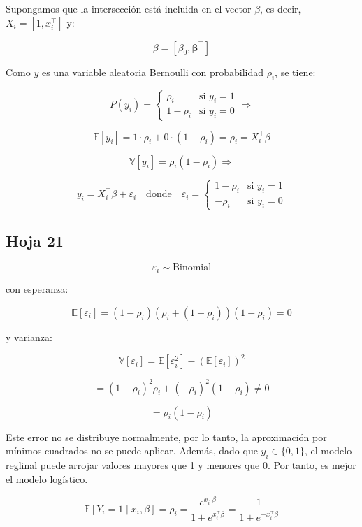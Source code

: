 \documentclass[12pt]{article}
\begin{document}
\noindent Supongamos que la intersección está incluida en el vector \( \beta \), es decir, \( X_i = [1, x_i^\top] \) y:

\[
\beta = [\beta_0, \boldsymbol{\beta}^\top]
\]

\noindent Como \( y \) es una variable aleatoria Bernoulli con probabilidad \( \rho_i \), se tiene:

\[
P(y_i) = 
\begin{cases}
\rho_i & \text{si } y_i = 1 \\
1 - \rho_i & \text{si } y_i = 0
\end{cases}
\Rightarrow
\]

\[
\mathbb{E}[y_i] = 1 \cdot \rho_i + 0 \cdot (1 - \rho_i) = \rho_i = X_i^\top \beta
\]

\[
\mathbb{V}[y_i] = \rho_i (1 - \rho_i)
\Rightarrow
\]

\[
y_i = X_i^\top \beta + \varepsilon_i \quad \text{donde} \quad
\varepsilon_i =
\begin{cases}
1 - \rho_i & \text{si } y_i = 1 \\
- \rho_i & \text{si } y_i = 0
\end{cases}
\]

\subsection{Hoja 21}


\[
\varepsilon_i \sim \text{Binomial}
\]

con esperanza:

\[
\mathbb{E}[\varepsilon_i] = (1 - \rho_i)(\rho_i + (1 - \rho_i))(1 - \rho_i) = 0
\]

y varianza:

\[
\mathbb{V}[\varepsilon_i] = \mathbb{E}[\varepsilon_i^2] - (\mathbb{E}[\varepsilon_i])^2
\]

\[
= (1 - \rho_i)^2 \rho_i + (-\rho_i)^2 (1 - \rho_i) \neq 0
\]

\[
= \rho_i (1 - \rho_i)
\]

Este error no se distribuye normalmente, por lo tanto, la aproximación por mínimos cuadrados no se puede aplicar. Además, dado que \( y_i \in \{0, 1\} \), el modelo reglinal puede arrojar valores mayores que 1 y menores que 0. Por tanto, es mejor el modelo logístico.

\medskip

\[
\mathbb{E}[Y_i = 1 \mid x_i, \beta] = \rho_i = \frac{e^{x_i^\top \beta}}{1 + e^{x_i^\top \beta}} = \frac{1}{1 + e^{-x_i^\top \beta}}
\]
\end{document}
